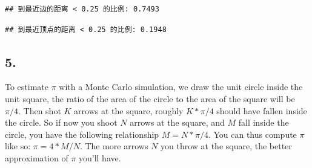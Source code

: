 \documentclass[
]{article}
\newenvironment{Shaded}{\begin{snugshade}}{\end{snugshade}}
\newcommand{\AttributeTok}[1]{\textcolor[rgb]{0.13,0.29,0.53}{#1}}
\newcommand{\CommentTok}[1]{\textcolor[rgb]{0.56,0.35,0.01}{\textit{#1}}}
\newcommand{\DecValTok}[1]{\textcolor[rgb]{0.00,0.00,0.81}{#1}}
\newcommand{\FunctionTok}[1]{\textcolor[rgb]{0.13,0.29,0.53}{\textbf{#1}}}
\newcommand{\NormalTok}[1]{#1}
\newcommand{\OtherTok}[1]{\textcolor[rgb]{0.56,0.35,0.01}{#1}}
\newcommand{\SpecialCharTok}[1]{\textcolor[rgb]{0.81,0.36,0.00}{\textbf{#1}}}
\newcommand{\StringTok}[1]{\textcolor[rgb]{0.31,0.60,0.02}{#1}}
\begin{document}
\begin{Shaded}
\end{Shaded}

\begin{verbatim}
## 到最近边的距离 < 0.25 的比例: 0.7493
\end{verbatim}

\begin{Shaded}
\end{Shaded}

\begin{verbatim}
## 到最近顶点的距离 < 0.25 的比例: 0.1948
\end{verbatim}

\subsection{5.}\label{section-4}

To estimate \(\pi\) with a Monte Carlo simulation, we draw the unit
circle inside the unit square, the ratio of the area of the circle to
the area of the square will be \(\pi / 4\). Then shot \(K\) arrows at
the square, roughly \(K * \pi / 4\) should have fallen inside the
circle. So if now you shoot \(N\) arrows at the square, and \(M\) fall
inside the circle, you have the following relationship
\(M = N * \pi / 4\). You can thus compute \(\pi\) like so:
\(\pi = 4 * M / N\). The more arrows \(N\) you throw at the square, the
better approximation of \(\pi\) you'll have.
\end{document}
